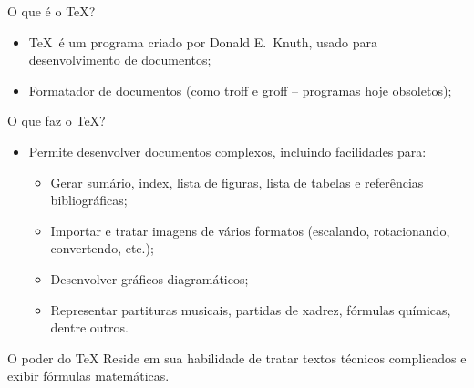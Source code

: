

\begin{frame}{O que é o \TeX?}
	\begin{itemize}
		\item \TeX~é um programa criado por Donald E.~Knuth, usado para desenvolvimento de documentos;
		\pause
		\item Formatador de documentos (como troff e groff -- programas hoje obsoletos);
	\end{itemize}
\end{frame}

\begin{frame}{O que faz o \TeX?}
	\begin{itemize}
		\item Permite desenvolver documentos complexos, incluindo facilidades para:
		\pause
	\begin{itemize}
		\item Gerar sumário, index, lista de figuras, lista de tabelas e referências bibliográficas;
		\pause		
		\item Importar e tratar imagens de vários formatos  (escalando, rotacionando, convertendo, etc.);
		\pause
		\item Desenvolver gráficos diagramáticos;
		\pause
		\item Representar partituras musicais, partidas de xadrez, fórmulas químicas, dentre outros.
	\end{itemize}
\end{itemize}

	\pause
	\begin{Observacao}{O poder do \TeX}
		Reside em sua habilidade de tratar textos técnicos complicados e exibir fórmulas matemáticas.
	\end{Observacao}
\end{frame}

